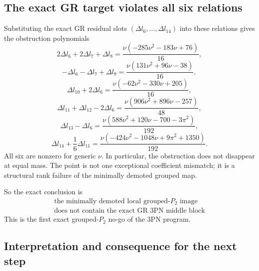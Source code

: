 \documentclass[11pt]{article}
\begin{document}
\subsection{The exact GR target violates all six relations}

Substituting the exact GR residual slots $(\Delta l_6,\dots,\Delta l_{14})$ into these relations gives the obstruction polynomials
\begin{equation}
  2\Delta l_6 + 2\Delta l_7 + \Delta l_8
  =
  \frac{\nu(-285\nu^2-183\nu+76)}{16},
\end{equation}
\begin{equation}
  -\Delta l_6 - \Delta l_7 + \Delta l_9
  =
  \frac{\nu(131\nu^2+96\nu-38)}{16},
\end{equation}
\begin{equation}
  \Delta l_{10} + 2\Delta l_6
  =
  \frac{\nu(-62\nu^2-330\nu+205)}{16},
\end{equation}
\begin{equation}
  \Delta l_{11} + \Delta l_{12} - 2\Delta l_6
  =
  \frac{\nu(906\nu^2+896\nu-257)}{48},
\end{equation}
\begin{equation}
  \Delta l_{13} - \Delta l_6
  =
  \frac{\nu(588\nu^2+120\nu-700-3\pi^2)}{192},
\end{equation}
\begin{equation}
  \Delta l_{14} + \frac{1}{6}\Delta l_{11}
  =
  \frac{\nu(-424\nu^2-1048\nu+9\pi^2+1350)}{192}.
\end{equation}
All six are nonzero for generic $\nu$. In particular, the obstruction does not disappear at equal mass. The point is not one exceptional coefficient mismatch; it is a structural rank failure of the minimally demoted grouped map.

So the exact conclusion is
\begin{equation}
  \boxed{\begin{gathered}
  \text{the minimally demoted local grouped-$P_2$ image}\\
  \text{does not contain the exact GR $3$PN middle block}
  \end{gathered}}
\end{equation}
This is the first exact grouped-$P_2$ no-go of the $3$PN program.

\subsection{Interpretation and consequence for the next step}
\end{document}
